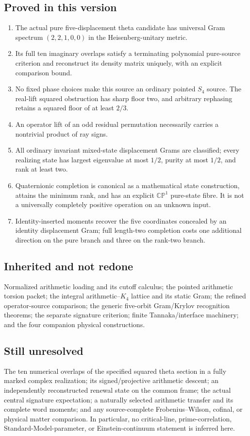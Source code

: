 \documentclass[11pt]{article}
\theoremstyle{definition}
\theoremstyle{remark}
\begin{document}
\subsection{Proved in this version}
\begin{enumerate}[label=\textup{(P\arabic*)},leftmargin=3em]
\item The actual pure five-displacement theta candidate has universal Gram
spectrum $(2,2,1,0,0)$ in the Heisenberg-unitary metric.
\item Its full ten imaginary overlaps satisfy a terminating polynomial
pure-source criterion and reconstruct its density matrix uniquely, with
an explicit comparison bound.
\item No fixed phase choices make this source an ordinary pointed $S_4$
source. The real-lift squared obstruction has sharp floor two, and arbitrary
rephasing retains a squared floor of at least $2/3$.
\item An operator lift of an odd residual permutation necessarily carries a
nontrivial product of ray signs.
\item All ordinary invariant mixed-state displacement Grams are classified;
every realizing state has largest eigenvalue at most $1/2$, purity at most
$1/2$, and rank at least two.
\item Quaternionic completion is canonical as a mathematical state
construction, attains the minimum rank, and has an explicit
$\mathbb{CP}^1$ pure-state fibre. It is not a universally completely positive
operation on an unknown input.
\item Identity-inserted moments recover the five coordinates concealed by an
identity displacement Gram; full length-two completion costs one additional
direction on the pure branch and three on the rank-two branch.
\end{enumerate}

\subsection{Inherited and not redone}
Normalized arithmetic loading and its cutoff calculus; the pointed
arithmetic torsion packet; the integral arithmetic--$K_4$ lattice and its
static Gram; the refined operator-source comparison; the generic five-orbit
Gram/Krylov recognition theorems; the separate signature criterion; finite
Tannaka/interface machinery; and the four companion physical constructions.

\subsection{Still unresolved}
The ten numerical overlaps of the specified squared theta section in a fully
marked complex realization; its signed/projective arithmetic descent; an
independently reconstructed renewal state on the common frame; the actual
central signature expectation; a naturally selected arithmetic transfer and
its complete word moments; and any source-complete Frobenius--Wilson,
cofinal, or physical matter comparison. In particular, no critical-line,
prime-correlation, Standard-Model-parameter, or Einstein-continuum statement
is inferred here.
\end{document}
